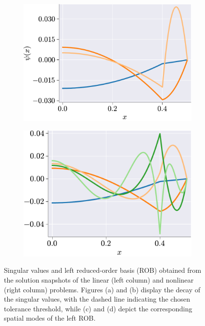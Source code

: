 \documentclass[11pt]{article}
\begin{document}
\begin{figure}[t]
\begin{subfigure}[b]{0.45\linewidth}
\centering
\includegraphics[width=\linewidth]{linear_Mode_shapes.pdf}
\caption{}
\label{fig:HC_ROM_c}
\end
{subfigure}
\begin{subfigure}[b]{0.45\linewidth}
\centering
\includegraphics[width=0.96\linewidth]{nonlinear_Mode_shapes.pdf}
\caption{}
\label{fig:HC_ROM_d}
\end{subfigure}
\caption{Singular values and left reduced-order basis (ROB) obtained from the solution snapshots of  the linear (left column) and nonlinear (right column) problems.
Figures (a) and (b) display the decay of the singular values, with the dashed line indicating the chosen tolerance threshold, while (c) and (d) depict the corresponding spatial modes of the left ROB.}
\label{fig:HC_ROM}
\end{figure}
\end{document}
